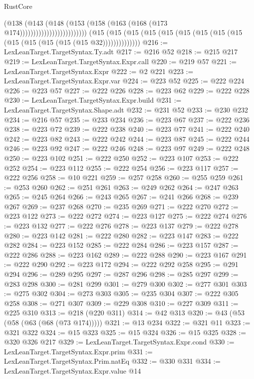 \begin{lexlean}{RustCore}
\begin{coremodule}
                                      (@138
                                        (@143
                                          (@148
                                            (@153
                                              (@158 (@163 (@168 (@173 @174)))))))))))))))))))))))))
    (@15 (@15 (@15 (@15 (@15 (@15 (@15 (@15 (@15 (@15 (@15 (@15 (@15 (@15 @32))))))))))))))
@216 := LexLeanTarget.TargetSyntax.Ty.adt
@217 := @216 @52
@218 := @215 @217
@219 := LexLeanTarget.TargetSyntax.Expr.call
@220 := @219 @57
@221 := LexLeanTarget.TargetSyntax.Expr
@222 := @2 @221
@223 := LexLeanTarget.TargetSyntax.Expr.var
@224 := @223 @52
@225 := @222 @224
@226 := @223 @57
@227 := @222 @226
@228 := @223 @62
@229 := @222 @228
@230 := LexLeanTarget.TargetSyntax.Expr.build
@231 := LexLeanTarget.TargetSyntax.Shape.adt
@232 := @231 @52
@233 := @230 @232
@234 := @216 @57
@235 := @233 @234
@236 := @223 @67
@237 := @222 @236
@238 := @223 @72
@239 := @222 @238
@240 := @223 @77
@241 := @222 @240
@242 := @223 @82
@243 := @222 @242
@244 := @223 @87
@245 := @222 @244
@246 := @223 @92
@247 := @222 @246
@248 := @223 @97
@249 := @222 @248
@250 := @223 @102
@251 := @222 @250
@252 := @223 @107
@253 := @222 @252
@254 := @223 @112
@255 := @222 @254
@256 := @223 @117
@257 := @222 @256
@258 := @10 @221
@259 := @257 @258
@260 := @255 @259
@261 := @253 @260
@262 := @251 @261
@263 := @249 @262
@264 := @247 @263
@265 := @245 @264
@266 := @243 @265
@267 := @241 @266
@268 := @239 @267
@269 := @237 @268
@270 := @235 @269
@271 := @222 @270
@272 := @223 @122
@273 := @222 @272
@274 := @223 @127
@275 := @222 @274
@276 := @223 @132
@277 := @222 @276
@278 := @223 @137
@279 := @222 @278
@280 := @223 @142
@281 := @222 @280
@282 := @223 @147
@283 := @222 @282
@284 := @223 @152
@285 := @222 @284
@286 := @223 @157
@287 := @222 @286
@288 := @223 @162
@289 := @222 @288
@290 := @223 @167
@291 := @222 @290
@292 := @223 @172
@294 := @222 @292 @258
@295 := @291 @294
@296 := @289 @295
@297 := @287 @296
@298 := @285 @297
@299 := @283 @298
@300 := @281 @299
@301 := @279 @300
@302 := @277 @301
@303 := @275 @302
@304 := @273 @303
@305 := @235 @304
@307 := @222 @305 @258
@308 := @271 @307
@309 := @229 @308
@310 := @227 @309
@311 := @225 @310
@313 := @218 (@220 @311)
@314 := @42 @313
@320 := @43 (@53 (@58 (@63 (@68 (@73 @174)))))
@321 := @13 @234
@322 := @321 @11
@323 := @321 @322
@324 := @15 @323
@325 := @15 @324
@326 := @15 @325
@328 := @320 @326 @217
@329 := LexLeanTarget.TargetSyntax.Expr.cond
@330 := LexLeanTarget.TargetSyntax.Expr.prim
@331 := LexLeanTarget.TargetSyntax.Prim.natEq
@332 := @330 @331
@334 := LexLeanTarget.TargetSyntax.Expr.value @14

\end{coremodule}
\end{lexlean}
